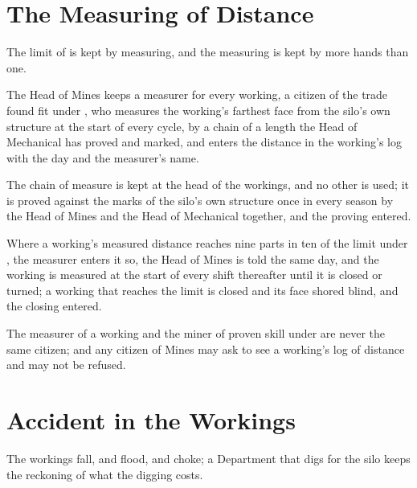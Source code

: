 \begin{setopen}
\section{The Measuring of Distance}
\label{sec:mines:measuring-of-distance}

The limit of  is kept by measuring, and the measuring is kept by more hands than one.

\begin{clauses}
\item The Head of Mines keeps a measurer for every working, a citizen of the trade found fit under , who measures the working's farthest face from the silo's own structure at the start of every cycle, by a chain of a length the Head of Mechanical has proved and marked, and enters the distance in the working's log with the day and the measurer's name.
\item The chain of measure is kept at the head of the workings, and no other is used; it is proved against the marks of the silo's own structure once in every season by the Head of Mines and the Head of Mechanical together, and the proving entered.
\item Where a working's measured distance reaches nine parts in ten of the limit under , the measurer enters it so, the Head of Mines is told the same day, and the working is measured at the start of every shift thereafter until it is closed or turned; a working that reaches the limit is closed and its face shored blind, and the closing entered.
\item The measurer of a working and the miner of proven skill under  are never the same citizen; and any citizen of Mines may ask to see a working's log of distance and may not be refused.
\end{clauses}

\section{Accident in the Workings}
\label{sec:mines:accident-in-the-workings}

The workings fall, and flood, and choke; a Department that digs for the silo keeps the reckoning of what the digging costs.


\end{setopen}

